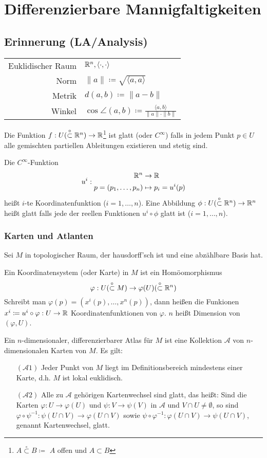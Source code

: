 \documentclass[a4paper,twoside,DIV15,BCOR12mm]{scrbook}
\newcommand{\otm}{\stackrel{\circ}{\subset}} %
\newcommand{\At}{\mathcal A}
\renewcommand{\da}{\coloneqq}
\begin{document}
\section{Differenzierbare Mannigfaltigkeiten}

\subsection*{Erinnerung (LA/Analysis)}
\begin{tabular}{rl}
Euklidischer Raum & $\mathbb{R}^n, \langle\cdot,\cdot\rangle$ \\
Norm & $ \|a\| \da  \sqrt{\langle a, a\rangle} $ \\
Metrik & $d(a,b) \da  \| a-b\| $ \\
Winkel & $\cos \angle(a,b) \da  \frac{\langle a, b\rangle}{\|a\|\cdot\|b\|} $ 
\end{tabular}

Die Funktion $f:U (\otm \MdR^n) \to \MdR$\footnote{$A\otm B \da  $ $A$ offen und $A\subset B$} ist glatt (oder $C^\infty$) falls in jedem Punkt $p\in U$ alle gemischten partiellen Ableitungen existieren und stetig sind.

Die $C^\infty$-Funktion
\[ u^i:
\begin{aligned}
\mathbb{R}^n &\to \mathbb{R} \\
p = (p_1,\ldots,p_n) &\mapsto p_i =u^i(p)
\end{aligned}
\]
heißt $i$-te Koordinatenfunktion ($i=1,\ldots,n$). Eine Abbildung $\phi: U(\otm \MdR^n)\to \MdR^n$ heißt glatt falls jede der reellen Funktionen $u^i\circ\phi$ glatt ist ($i=1,\ldots,n$).

\subsubsection*{Karten und Atlanten}
Sei $M$ in topologischer Raum, der hausdorff’sch ist und eine abzählbare Basis hat.

Ein Koordinatensystem (oder Karte) in $M$ ist ein Homöomorphismus
\[\varphi: U(\otm M) \to \varphi(U) (\otm\MdR^n) \]
Schreibt man $\varphi(p) = (x^i(p),\ldots,x^n(p))$, dann heißen die Funkionen $x^i \da  u^i\circ \varphi : U \to \MdR$ Koordinatenfunktionen von $\varphi$. $n$ heißt Dimension von $(\varphi,U)$.

Ein $n$-dimensionaler, differenzierbarer Atlas für $M$ ist eine Kollektion $\At$ von $n$-dimensionalen Karten von $M$. Es gilt:
\begin{itemize}
\item[$(\At1)$] Jeder Punkt von $M$ liegt im Definitionsbereich mindestens einer Karte, d.h. $M$ ist lokal euklidisch.
\item[$(\At2)$] Alle zu $\At$ gehörigen Kartenwechsel sind glatt, das heißt: Sind die Karten $\varphi: U\to \varphi(U)$ und $\psi:V\to\psi(V)$ in $\At$ und $V\cap U \ne \emptyset$, so sind $\varphi \circ \psi^{-1}: \psi(U\cap V) \to \varphi(U\cap V)$ sowie $\psi \circ \varphi^{-1}: \varphi(U\cap V) \to \psi(U \cap V)$, genannt Kartenwechsel, glatt.
\end{itemize}
\end{document}
